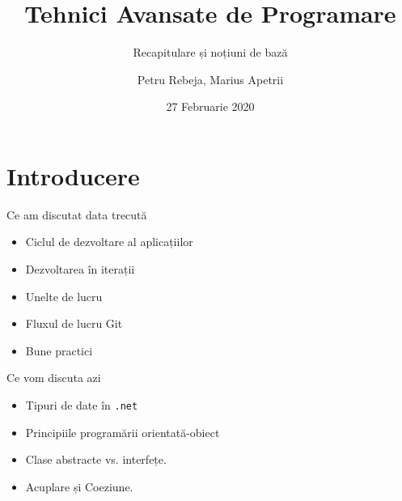 \documentclass[presentation]{beamer}
\author{Petru Rebeja, Marius Apetrii}
\date{27 Februarie 2020}
\title{Tehnici Avansate de Programare}
\subtitle{Recapitulare și noțiuni de bază}
\institute[UAIC]{Facultatea de Matematică\\Universitatea Alexandru Ioan Cuza, Iași}
\begin{document}
\maketitle
\section{Introducere}
\label{sec:org698769d}
\begin{frame}[label={sec:orga35dd45}]{Ce am discutat data trecută}
\pause
\begin{itemize}
\item Ciclul de dezvoltare al aplicațiilor
\item Dezvoltarea în iterații
\item Unelte de lucru
\item Fluxul de lucru Git
\item Bune practici
\end{itemize}
\end{frame}
\begin{frame}[label={sec:org5adcbf0},fragile]{Ce vom discuta azi}
 \begin{itemize}
\item Tipuri de date în \texttt{.net}
\item Principiile programării orientată-obiect
\item Clase abstracte vs. interfețe.
\item Acuplare și Coeziune.
\end{itemize}
\end{frame}
\end{document}
